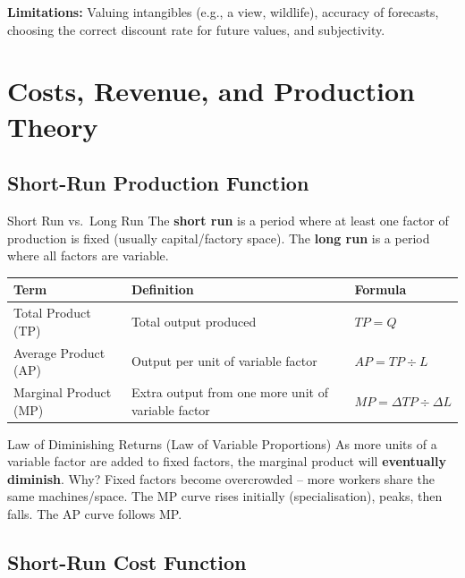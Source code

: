 \documentclass[11pt, a4paper, twoside]{book}
\begin{document}
\textbf{Limitations:} Valuing intangibles (e.g., a view, wildlife), accuracy of forecasts, choosing the correct discount rate for future values, and subjectivity.

\section{Costs, Revenue, and Production Theory}

\subsection{Short-Run Production Function}

\begin{keyterm}{Short Run vs.\ Long Run}
The \textbf{short run} is a period where at least one factor of production is fixed (usually capital/factory space). The \textbf{long run} is a period where all factors are variable.
\end{keyterm}

\begin{example}
\begin{tabular}{@{}lll@{}}
\textbf{Term} & \textbf{Definition} & \textbf{Formula} \\
\midrule
Total Product (TP) & Total output produced & $TP = Q$ \\
Average Product (AP) & Output per unit of variable factor & $AP = TP \div L$ \\
Marginal Product (MP) & Extra output from one more unit of variable factor & $MP = \Delta TP \div \Delta L$ \\
\end{tabular}
\end{example}

\begin{keyterm}{Law of Diminishing Returns (Law of Variable Proportions)}
As more units of a variable factor are added to fixed factors, the marginal product will \textbf{eventually diminish}. Why? Fixed factors become overcrowded -- more workers share the same machines/space. The MP curve rises initially (specialisation), peaks, then falls. The AP curve follows MP.
\end{keyterm}

\subsection{Short-Run Cost Function}
\end{document}
